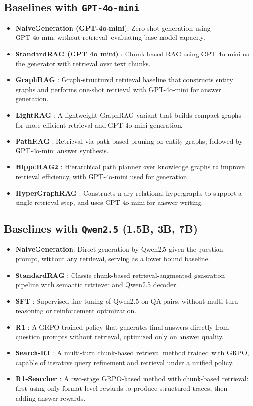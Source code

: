 \documentclass{article}
\theoremstyle{plain}
\theoremstyle{definition}
\theoremstyle{remark}
\begin{document}
\subsection{Baselines with \texttt{GPT‑4o‑mini}}
\begin{itemize}[leftmargin=*]
  \item \textbf{NaiveGeneration (GPT‑4o‑mini)}: Zero‑shot generation using GPT‑4o‑mini without retrieval, evaluating base model capacity.
  \item \textbf{StandardRAG (GPT‑4o‑mini)} \citep{RAG}: Chunk‑based RAG using GPT‑4o‑mini as the generator with retrieval over text chunks.
  \item \textbf{GraphRAG} \citep{GraphRAG}: Graph‑structured retrieval baseline that constructs entity graphs and performs one‑shot retrieval with GPT‑4o‑mini for answer generation.
  \item \textbf{LightRAG} \citep{LightRAG}: A lightweight GraphRAG variant that builds compact graphs for more efficient retrieval and GPT‑4o‑mini generation.
  \item \textbf{PathRAG} \citep{PathRAG}: Retrieval via path-based pruning on entity graphs, followed by GPT‑4o‑mini answer synthesis.
  \item \textbf{HippoRAG2} \citep{HippoRAG2}: Hierarchical path planner over knowledge graphs to improve retrieval efficiency, with GPT‑4o‑mini used for generation.
  \item \textbf{HyperGraphRAG} \citep{HyperGraphRAG}: Constructs n‑ary relational hypergraphs to support a single retrieval step, and uses GPT‑4o‑mini for answer writing.
\end{itemize}
\vspace{-1.5mm}
\subsection{Baselines with \texttt{Qwen2.5} (1.5B, 3B, 7B)}
\begin{itemize}[leftmargin=*]
  \item \textbf{NaiveGeneration}: Direct generation by Qwen2.5 given the question prompt, without any retrieval, serving as a lower bound baseline.
  \item \textbf{StandardRAG} \citep{RAG}: Classic chunk-based retrieval-augmented generation pipeline with semantic retriever and Qwen2.5 decoder.
  \item \textbf{SFT} \citep{SFT}: Supervised fine-tuning of Qwen2.5 on QA pairs, without multi-turn reasoning or reinforcement optimization.
  \item \textbf{R1} \citep{GRPO}: A GRPO-trained policy that generates final answers directly from question prompts without retrieval, optimized only on answer quality.
  \item \textbf{Search‑R1} \citep{Search-R1}: A multi-turn chunk-based retrieval method trained with GRPO, capable of iterative query refinement and retrieval under a unified policy.
  \item \textbf{R1‑Searcher} \citep{R1-Searcher}: A two-stage GRPO-based method with chunk-based retrieval: first using only format-level rewards to produce structured traces, then adding answer rewards.
\end{itemize}
\end{document}
